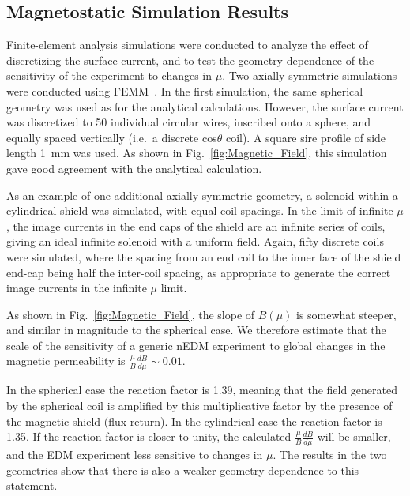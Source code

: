 \subsection{Magnetostatic Simulation Results \label{sec:femm}}

Finite-element analysis simulations were conducted to analyze the
effect of discretizing the surface current, and to test the geometry
dependence of the sensitivity of the experiment to changes in $\mu$.
Two axially symmetric simulations were conducted using
FEMM~\cite{bib:femm}.  In the first simulation, the same spherical
geometry was used as for the analytical calculations.  However, the
surface current was discretized to 50 individual circular wires,
inscribed onto a sphere, and equally spaced vertically (i.e.~a
discrete cos$\theta$ coil).  A square sire profile of side length 1~mm
was used.  As shown in Fig.~\ref{fig:Magnetic_Field}, this simulation
gave good agreement with the analytical calculation.

As an example of one additional axially symmetric geometry, a solenoid
within a cylindrical shield was simulated, with equal coil spacings.
In the limit of infinite $\mu$, the image currents in the end caps of
the shield are an infinite series of coils, giving an ideal infinite
solenoid with a uniform field.  Again, fifty discrete coils were
simulated, where the spacing from an end coil to the inner face of the
shield end-cap being half the inter-coil spacing, as appropriate to
generate the correct image currents in the infinite $\mu$ limit. 

As shown in Fig.~\ref{fig:Magnetic_Field}, the slope of $B(\mu)$ is
somewhat steeper, and similar in magnitude to the spherical case.  We
therefore estimate that the scale of the sensitivity of a generic nEDM
experiment to global changes in the magnetic permeability is
$\frac{\mu}{B}\frac{dB}{d\mu}\sim 0.01$.

In the spherical case the reaction factor is 1.39, meaning that the
field generated by the spherical coil is amplified by this
multiplicative factor by the presence of the magnetic shield (flux
return).  In the cylindrical case the reaction factor is 1.35.  If the
reaction factor is closer to unity, the calculated
$\frac{\mu}{B}\frac{dB}{d\mu}$ will be smaller, and the EDM experiment
less sensitive to changes in $\mu$.  The results in the two geometries
show that there is also a weaker geometry dependence to this
statement.



